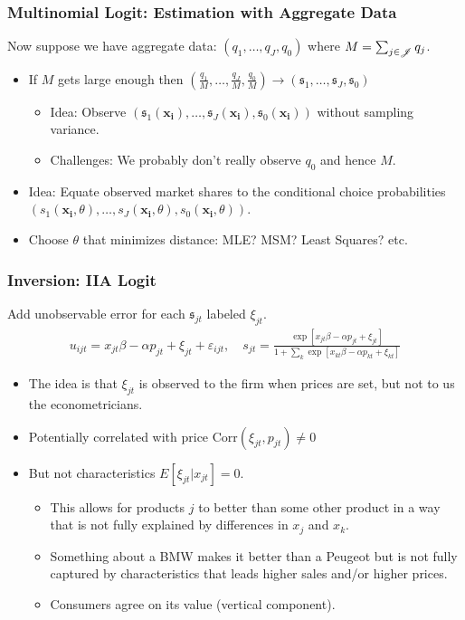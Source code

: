 \documentclass[aspectratio=169,11pt]{beamer}
\begin{document}
\begin{frame}
\frametitle{Multinomial Logit: Estimation with Aggregate Data}
Now suppose we have aggregate data: $(q_1,\ldots,q_J,q_0)$ where $M = \sum_{j \in \mathscr{J}} q_j$.
\begin{itemize}
\item If $M$ gets large enough then $(\frac{q_1}{M},\ldots,\frac{q_J}{M},\frac{q_0}{M})\rightarrow (\mathfrak{s}_1,\ldots,\mathfrak{s}_J,\mathfrak{s}_0)$
\begin{itemize}
\item Idea: Observe $(\mathfrak{s}_1(\symbf{x_i}),\ldots,\mathfrak{s}_J(\symbf{x_i}), \mathfrak{s}_0(\symbf{x_i}))$ without sampling variance.
\item  Challenges: We probably don't really observe $q_0$ and hence $M$.
\end{itemize}
\item Idea: Equate observed market shares to the conditional choice probabilities $(s_1(\symbf{x_i},\theta),\ldots,s_J(\symbf{x_i},\theta),s_0(\symbf{x_i},\theta))$.
\item Choose $\theta$ that minimizes distance: MLE? MSM? Least Squares? etc.
\end{itemize}
\end{frame}

\begin{frame}
\frametitle{Inversion: IIA Logit}
Add unobservable error for each $\mathfrak{s}_{jt}$ labeled $\xi_{jt}$.
\begin{align*}
u_{ijt} = x_{jt} \beta -\alpha p_{jt} + \xi_{jt} +  \varepsilon_{ijt} , \quad 
s_{jt} = \frac{\exp[x_{jt} \beta -\alpha p_{jt} + \xi_{jt} ]}{1+\sum_k \exp[x_{kt} \beta -\alpha p_{kt}  + \xi_{kt} ]} 
\end{align*}
\begin{itemize}
\item The idea is that $\xi_{jt}$ is observed to the firm when prices are set, but not to us the econometricians.
\item Potentially correlated with price $\text{Corr}(\xi_{jt},p_{jt}) \neq 0$
\item But not characteristics $E[\xi_{jt} | x_{jt}]=0$.
\begin{itemize}
\item This allows for products $j$ to better than some other product in a way that is not fully explained by differences in $x_j$ and $x_k$.
\item Something about a BMW makes it better than a Peugeot but is not fully captured by characteristics that leads higher sales and/or higher prices.
\item Consumers agree on its value  (\alert{vertical component}).
\end{itemize}
\end{itemize}
\end{frame}
\end{document}
